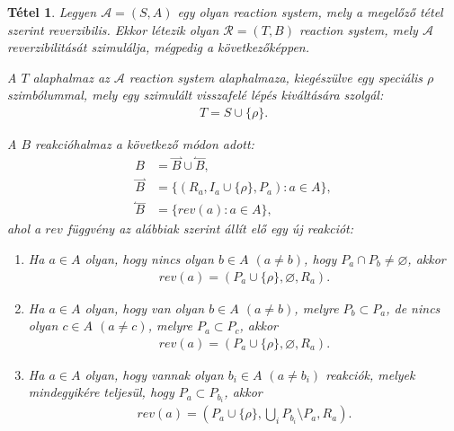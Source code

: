 \documentclass[12pt]{article}
\theoremstyle{definition}
\theoremstyle{remark}
\theoremstyle{plain}
\newtheorem*{theorem*}{Tétel}
\let\emptyset\varnothing
\newcommand{\forwardhat}{\overset{\rightharpoonup}}
\newcommand{\backwardhat}{\overset{\leftharpoonup}}
\begin{document}
    \begin{theorem*}
        Legyen $\mathscr{A} = (S, A)$ egy olyan \textit{reaction system}, mely a megelőző tétel szerint reverzibilis. Ekkor létezik olyan $\mathscr{R} = (T, B)$ \textit{reaction system}, mely $\mathscr{A}$ reverzibilitását szimulálja, mégpedig a következőképpen.
        
        A $T$ alaphalmaz az $\mathscr{A}$ \textit{reaction system} alaphalmaza, kiegészülve egy speciális $\rho$ szimbólummal, mely egy szimulált visszafelé lépés kiváltására szolgál:
        \begin{align*}
            T = S \cup \{ \rho \}.
        \end{align*}

        A $B$ reakcióhalmaz a következő módon adott:
        \begin{align*}
            B &= \forwardhat B \cup \backwardhat B, \\
            \forwardhat B &= \{ (R_{a}, I_{a} \cup \{ \rho \}, P_{a}) : a \in A\}, \\
            \backwardhat B &= \{ \textit{rev}(a) : a \in A \},
        \end{align*}
        ahol a $\textit{rev}$ függvény az alábbiak szerint állít elő egy új reakciót:
        \begin{enumerate}[label={(\arabic*)}]
            \item
            Ha $a \in A$ olyan, hogy nincs olyan $b \in A$ $(a \neq b)$, hogy $P_{a} \cap P_{b} \neq \emptyset$, akkor
            \begin{align*}
                \textit{rev}(a) = (P_{a} \cup \{ \rho \} , \emptyset, R_{a}).
            \end{align*}
            
            \item
            Ha $a \in A$ olyan, hogy van olyan $b \in A$ $(a \neq b)$, melyre $P_{b} \subset P_{a}$, de nincs olyan $c \in A$ $(a \neq c)$, melyre $P_{a} \subset P_{c}$, akkor
            \begin{align*}
                \textit{rev}(a) = (P_{a} \cup \{ \rho \}, \emptyset, R_{a}).
            \end{align*}

            \item
            Ha $a \in A$ olyan, hogy vannak olyan $b_{i} \in A$ $(a \neq b_{i})$ reakciók, melyek mindegyikére teljesül, hogy $P_{a} \subset P_{b_{i}}$, akkor
            \begin{align*}
                \textit{rev}(a) = (P_{a} \cup \{ \rho \}, \bigcup\limits_{i}P_{b_{i}} \setminus P_{a}, R_{a}).
            \end{align*}


\end{enumerate}
\end{theorem*}
\end{document}
